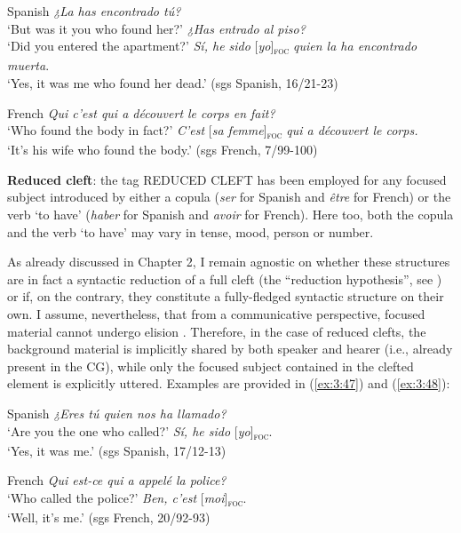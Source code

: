 \begin{description}
\ea  \label{ex:3:45} Spanish
\ea \textit{¿La has encontrado tú?} \\
 ‘But was it you who found her?'
 \textit{¿Has entrado al piso?}\\
`Did you entered the apartment?'
\ex \textit{Sí, he sido} [\textit{yo}]\textsubscript{\textsc{foc}} \normalsize \textit{quien la ha encontrado muerta}. \\
‘Yes, it was me who found her dead.' \hfill (sgs Spanish, 16/21-23)   
\z
\z
  
\ea \label{ex:3:46}  French
\ea  \textit{Qui c'est qui a découvert le corps en fait?}\\
 ‘Who found the body in fact?'
\ex \textit{C'est} [\textit{sa femme}]\textsubscript{\textsc{foc}} \normalsize \textit{qui a découvert le corps.} \\
‘It's his wife who found the body.' \hfill (sgs French, 7/99-100)    
\z \z 

\item \textbf{Reduced cleft}: the tag {\selectfont REDUCED CLEFT} has been employed for any focused subject introduced by either a copula (\textit{ser} for Spanish and \textit{être} for French) or the verb `to have' (\textit{haber} for Spanish and \textit{avoir} for French). Here too, both the copula and the verb `to have' may vary in tense, mood, person or number.

As already discussed in Chapter 2, I remain agnostic on whether these structures are in fact a syntactic reduction of a full cleft (the ``reduction hypothesis”, see \cite{jenkins2017cleft}) or if, on the contrary, they constitute a fully-fledged syntactic structure on their own. I assume, nevertheless, that from a communicative perspective, focused material cannot undergo elision \parencite{yoshida2013predictive}. Therefore, in the case of reduced clefts, the background material is implicitly shared by both speaker and hearer (i.e., already present in the CG), while only the focused subject contained in the clefted element is explicitly uttered. Examples are provided in (\ref{ex:3:47}) and (\ref{ex:3:48}):

\ea  \label{ex:3:47}  Spanish
\ea \textit{¿Eres tú quien nos ha llamado?} \\
 ‘Are you the one who called?'
\ex  \textit{Sí, he sido}  [\textit{yo}]\textsubscript{\textsc{foc}}. \\
\normalsize‘Yes, it was me.' \hfill (sgs Spanish, 17/12-13)   
\z \z
 
 \ea \label{ex:3:48} French
\ea  \textit{Qui est-ce qui a appelé la police? }\\
 ‘Who called the police?'
\ex \textit{ Ben, c'est} {[\textit{moi}]\textsubscript{\textsc{foc}}}\normalsize. \\
‘Well, it's me.' \hfill (sgs French, 20/92-93)  
\z \z 


\end{description}
